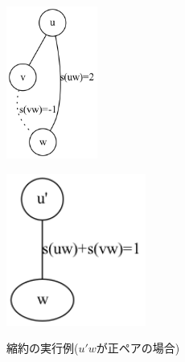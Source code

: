 \documentclass[10.5,a4paper,titlepage, dvipdfmx]{bxjsarticle}
\begin{document}
\begin{figure}[H]
    \centering
    \begin{minipage}{0.48\hsize}
        \centering
        \includegraphics[height=5cm]{merge3.png}
        \label{fig:left}
    \end{minipage}
    \begin{minipage}{0.48\hsize}
        \centering
        \includegraphics[height=5cm]{merge3_1.png}
        \label{fig:right}
    \end{minipage}
    \caption{縮約の実行例($u'w$が正ペアの場合)}
    \label{fig:left_right}
\end{figure}
\end{document}
